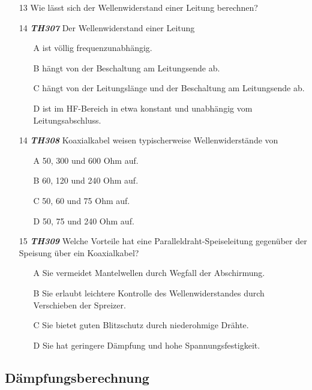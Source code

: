\begin{enumerate} 
\itemsep1pt\parskip0pt
\item[13] Wie lässt sich der Wellenwiderstand einer Leitung berechnen?
\item[14] \emph{\textbf{TH307}}  Der Wellenwiderstand einer Leitung
	\begin{enumerate}
	\itemsep1pt\parskip0pt
		\item[A] ist völlig frequenzunabhängig.
		\item[B] hängt von der Beschaltung am Leitungsende ab.
		\item[C] hängt von der Leitungslänge und der Beschaltung am Leitungsende ab.
		\item[D] ist im HF-Bereich in etwa konstant und unabhängig vom Leitungsabschluss.
	\end{enumerate}
\item[14] \emph{\textbf{TH308}}  Koaxialkabel weisen typischerweise Wellenwiderstände von
	\begin{enumerate}
	\itemsep1pt\parskip0pt
		\item[A] 50, 300 und 600 Ohm auf.
		\item[B] 60, 120 und 240 Ohm auf.
		\item[C] 50, 60 und 75 Ohm auf.
		\item[D] 50, 75 und 240 Ohm auf.
	\end{enumerate}
\item[15] \emph{\textbf{TH309}}  Welche Vorteile hat eine Paralleldraht-Speiseleitung gegenüber der Speisung über ein Koaxialkabel?
	\begin{enumerate}
	\itemsep1pt\parskip0pt
		\item[A] Sie vermeidet Mantelwellen durch Wegfall der Abschirmung.
		\item[B] Sie erlaubt leichtere Kontrolle des Wellenwiderstandes durch Verschieben der Spreizer.
		\item[C] Sie bietet guten Blitzschutz durch niederohmige Drähte.
		\item[D] Sie hat geringere Dämpfung und hohe Spannungsfestigkeit.
	\end{enumerate}
\end{enumerate}

\subsection*{Dämpfungsberechnung}

